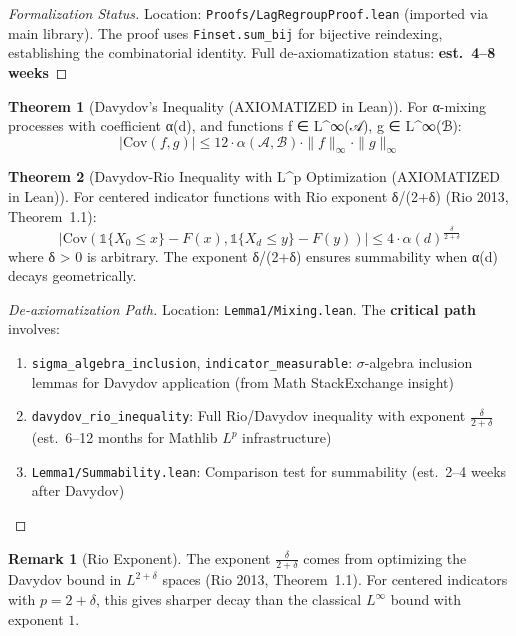 \documentclass[final,3p,twocolumn,times,authoryear]{elsarticle}
\theoremstyle{definition}
\newtheorem{theorem}{Theorem}[section]
\newtheorem{remark}{Remark}[section]
\begin{document}
\begin{proof}[Formalization Status]
Location: \texttt{Proofs/LagRegroupProof.lean} (imported via main library). The proof uses \texttt{Finset.sum\_bij} for bijective reindexing, establishing the combinatorial identity. Full de-axiomatization status: \textbf{est.~4--8 weeks}
\end{proof}

\begin{theorem}[Davydov's Inequality (AXIOMATIZED in Lean)]
    \label{thm:davydov-full}
    For α-mixing processes with coefficient α(d), and functions f ∈ L^∞(𝒜), g ∈ L^∞(ℬ):
    \begin{equation}
        |\text{Cov}(f, g)| \leq 12 \cdot \alpha(\mathcal{A},\mathcal{B}) \cdot \|f\|_\infty \cdot \|g\|_\infty
    \end{equation}
\end{theorem}

\begin{theorem}[Davydov-Rio Inequality with L^p Optimization (AXIOMATIZED in Lean)]
    \label{thm:davydov-rio}
    For centered indicator functions with Rio exponent δ/(2+δ) (Rio 2013, Theorem~1.1):
    \begin{equation}
        |\text{Cov}(\mathbb{1}\{X_0 \leq x\} - F(x), \mathbb{1}\{X_d \leq y\} - F(y))| \leq 4 \cdot \alpha(d)^{\frac{\delta}{2+\delta}}
    \end{equation}
    where δ \textgreater{} 0 is arbitrary. The exponent δ/(2+δ) ensures summability when α(d) decays geometrically.
\end{theorem}

\begin{proof}[De-axiomatization Path]
Location: \texttt{Lemma1/Mixing.lean}. The \textbf{critical path} involves:
\begin{enumerate}
    \item \texttt{sigma_algebra_inclusion}, \texttt{indicator_measurable}: $\sigma$-algebra inclusion lemmas for Davydov application (from Math StackExchange insight)
    \item \texttt{davydov_rio_inequality}: Full Rio/Davydov inequality with exponent $\frac{\delta}{2+\delta}$ (est.\ 6--12 months for Mathlib $L^p$ infrastructure)
    \item \texttt{Lemma1/Summability.lean}: Comparison test for summability (est.\ 2--4 weeks after Davydov)
\end{enumerate}
\end{proof}

\begin{remark}[Rio Exponent]
The exponent $\frac{\delta}{2+\delta}$ comes from optimizing the Davydov bound in $L^{2+\delta}$ spaces (Rio 2013, Theorem~1.1). For centered indicators with $p = 2+\delta$, this gives sharper decay than the classical $L^\infty$ bound with exponent $1$.
\end{remark}
\end{document}
